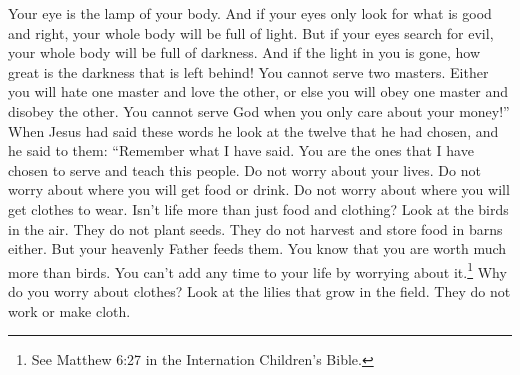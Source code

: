 Your eye is the lamp of your body. And if your eyes only look for what is good and right, your whole body will be full of light.
\bverse \iffalse But if thine eye be evil, thy whole body shall be full of darkness. If, therefore, the light that is in thee be darkness, how great is that darkness! \fi
But if your eyes search for evil, your whole body will be full of darkness. And if the light in you is gone, how great is the darkness that is left behind!
\bverse \iffalse No man can serve two masters; for either he will hate the one and love the other, or else he will hold to the one and despise the other. Ye cannot serve God and Mammon. \fi
You cannot serve two masters. Either you will hate one master and love the other, or else you will obey one master and disobey the other. You cannot serve God when you only care about your money!''
\bverse \iffalse And now it came to pass that when Jesus had spoken these words he looked upon the twelve whom he had chosen, and said unto them: Remember the words which I have spoken. For behold, ye are they whom I have chosen to minister unto this people. Therefore I say unto you, take no thought for your life, what ye shall eat, or what ye shall drink; nor yet for your body, what ye shall put on. Is not the life more than meat, and the body than raiment? \fi
When Jesus had said these words he look at the twelve that he had chosen, and he said to them: ``Remember what I have said. You are the ones that I have chosen to serve and teach this people. Do not worry about your lives. Do not worry about where you will get food or drink. Do not worry about where you will get clothes to wear. Isn't life more than just food and clothing?
\bverse \iffalse Behold the fowls of the air, for they sow not, neither do they reap nor gather into barns; yet your heavenly Father feedeth them. Are ye not much better than they? \fi
Look at the birds in the air. They do not plant seeds. They do not harvest and store food in barns either. But your heavenly Father feeds them. You know that you are worth much more than birds. 
\bverse \iffalse Which of you by taking thought can add one cubit unto his stature? \fi
You can't add any time to your life by worrying about it.\footnote{See Matthew 6:27 in the Internation Children's Bible.}
\bverse \iffalse And why take ye thought for raiment? Consider the lilies of the field how they grow; they toil not, neither do they spin; \fi
Why do you worry about clothes? Look at the lilies that grow in the field. They do not work or make cloth.
